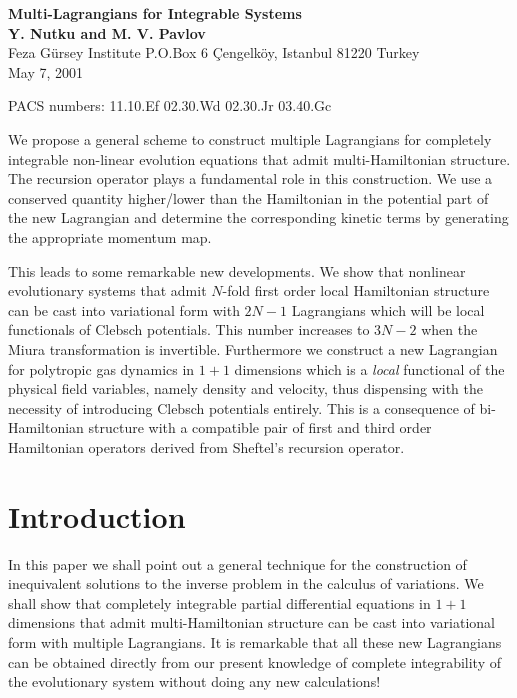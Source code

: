 \documentclass[a4paper,12pt]{article}
\begin{document}
\begin{center}
{\Large {\bf Multi-Lagrangians for Integrable Systems}}\\[4mm]
{\Large {\bf Y. Nutku and M. V. Pavlov}}\\[2mm] Feza G\"ursey
Institute P.O.Box 6 \c{C}engelk\"oy, Istanbul 81220 Turkey\\
May 7, 2001
\end{center}

PACS numbers: 11.10.Ef   02.30.Wd  02.30.Jr  03.40.Gc


We propose a general scheme to construct multiple Lagrangians for
completely integrable non-linear evolution equations that admit
multi-Hamilton\-ian structure. The recursion operator plays a
fundamental role in this construction. We use a conserved quantity
higher/lower than the Hamiltonian in the potential part of the new
Lagrangian and determine the corresponding kinetic terms by
generating the appropriate momentum map.

This leads to some remarkable new developments. We show that
nonlinear evolutionary systems that admit $N$-fold first order
local Hamiltonian structure can be cast into variational form with
$2N-1$ Lagrangians which will be local functionals of Clebsch
potentials. This number increases to $3 N -2$ when the Miura
transformation is invertible. Furthermore we construct a new
Lagrangian for polytropic gas dynamics in $1+1$ dimensions which
is a {\it local} functional of the physical field variables,
namely density and velocity, thus dispensing with the necessity of
introducing Clebsch potentials entirely. This is a consequence of
bi-Hamiltonian structure with a compatible pair of first and third
order Hamiltonian operators derived from Sheftel's recursion
operator.

\section{Introduction}

In this paper we shall point out a general technique for the
construction of inequivalent solutions to the inverse problem in
the calculus of variations. We shall show that completely
integrable partial differential equations in $1+1$ dimensions that
admit multi-Hamiltonian structure can be cast into variational
form with multiple Lagrangians. It is remarkable that all these
new Lagrangians can be obtained directly from our present
knowledge of complete integrability of the evolutionary system
without doing any new calculations!
\end{document}
